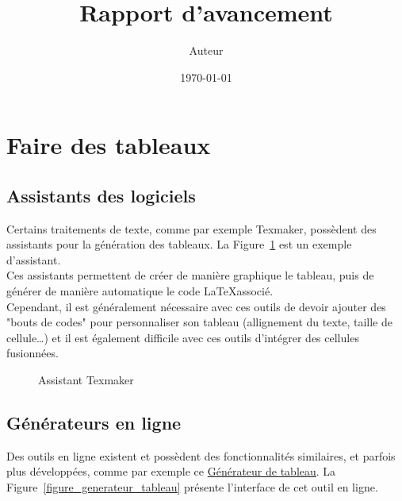 \documentclass[a4paper,12pt]{report}
\author{Auteur}
\title{Rapport d'avancement}
\date{\today}
\begin{document}
\graphicspath{{Figures/}}




\renewcommand\contentsname{Sommaire}
\setcounter{chapter}{1}
\tableofcontents



\newpage

\section{Faire des tableaux}
\subsection{Assistants des logiciels}
Certains traitements de texte, comme par exemple Texmaker, possèdent des assistants pour la génération des tableaux. La Figure~\ref{figure_assistant_tableau} est un exemple d'assistant. \\

Ces assistants permettent de créer de manière graphique le tableau, puis de générer de manière automatique le code \LaTeX associé. \\

Cependant, il est généralement nécessaire avec ces outils de devoir ajouter des "bouts de codes" pour personnaliser son tableau (allignement du texte, taille de cellule\ldots) et il est également difficile avec ces outils d'intégrer des cellules fusionnées.

\begin{figure}[hbtp]
	\centering
	\def\svgwidth{0.9\columnwidth}
	\fontsize{10pt}{10pt}\selectfont
	\caption{Assistant Texmaker}
	\label{figure_assistant_tableau}
\end{figure}

\subsection{Générateurs en ligne}
Des outils en ligne existent et possèdent des fonctionnalités similaires, et parfois plus développées, comme par exemple ce \href{http://www.tablesgenerator.com/latex_tables}{Générateur de tableau}. La Figure~\ref{figure_generateur_tableau} présente l'interface de cet outil en ligne. \\
\end{document}
